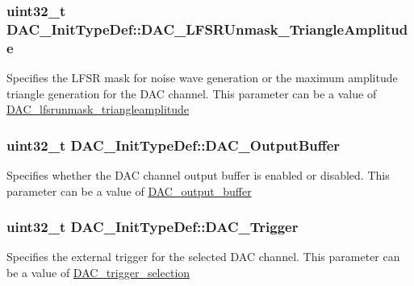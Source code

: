 \subsubsection[{D\+A\+C\+\_\+\+L\+F\+S\+R\+Unmask\+\_\+\+Triangle\+Amplitude}]{\setlength{\rightskip}{0pt plus 5cm}uint32\+\_\+t D\+A\+C\+\_\+\+Init\+Type\+Def\+::\+D\+A\+C\+\_\+\+L\+F\+S\+R\+Unmask\+\_\+\+Triangle\+Amplitude}\label{struct_d_a_c___init_type_def_a27ed27a544d50781b20d59cc55e6cef8}
Specifies the L\+F\+S\+R mask for noise wave generation or the maximum amplitude triangle generation for the D\+A\+C channel. This parameter can be a value of \hyperlink{group___d_a_c__lfsrunmask__triangleamplitude}{D\+A\+C\+\_\+lfsrunmask\+\_\+triangleamplitude} \hypertarget{struct_d_a_c___init_type_def_ad3e9e01486443e99f19e65a446b03ca6}{}
\subsubsection[{D\+A\+C\+\_\+\+Output\+Buffer}]{\setlength{\rightskip}{0pt plus 5cm}uint32\+\_\+t D\+A\+C\+\_\+\+Init\+Type\+Def\+::\+D\+A\+C\+\_\+\+Output\+Buffer}\label{struct_d_a_c___init_type_def_ad3e9e01486443e99f19e65a446b03ca6}
Specifies whether the D\+A\+C channel output buffer is enabled or disabled. This parameter can be a value of \hyperlink{group___d_a_c__output__buffer}{D\+A\+C\+\_\+output\+\_\+buffer} \hypertarget{struct_d_a_c___init_type_def_a7b26ebaeb51a0157a781f7de8ba779e5}{}
\subsubsection[{D\+A\+C\+\_\+\+Trigger}]{\setlength{\rightskip}{0pt plus 5cm}uint32\+\_\+t D\+A\+C\+\_\+\+Init\+Type\+Def\+::\+D\+A\+C\+\_\+\+Trigger}\label{struct_d_a_c___init_type_def_a7b26ebaeb51a0157a781f7de8ba779e5}
Specifies the external trigger for the selected D\+A\+C channel. This parameter can be a value of \hyperlink{group___d_a_c__trigger__selection}{D\+A\+C\+\_\+trigger\+\_\+selection} \hypertarget{struct_d_a_c___init_type_def_a6753e78ddd2dc8273444ba01a272d63a}{}
